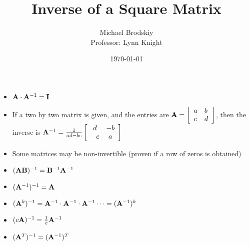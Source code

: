 \documentclass[12pt]{article}
\title{Inverse of a Square Matrix}
\date{\today}
\author{Michael Brodskiy\\ \small Professor: Lynn Knight}
\begin{document}
\maketitle

\begin{itemize}

  \item $\bold{A}\cdot\bold{A}^{-1}=\bold{I}$

  \item If a two by two matrix is given, and the entries are $\bold{A}=\left[ \begin{array}{l l} a & b\\ c & d\\ \end{array} \right]$, then the inverse is $\bold{A}^{-1}=\frac{1}{ad-bc}\left[ \begin{array}{c c} d & -b\\ -c & a\\ \end{array} \right]$

  \item Some matrices may be non-invertible (proven if a row of zeros is obtained)

  \item $(\bold{AB})^{-1}=\bold{B}^{-1}\bold{A}^{-1}$

  \item $(\bold{A}^{-1})^{-1}=\bold{A}$

  \item $(\bold{A}^{k})^{-1}=\bold{A}^{-1}\cdot\bold{A}^{-1}\cdot\bold{A}^{-1}\dots=(\bold{A}^{-1})^k$

  \item $(c\bold{A})^{-1}=\frac{1}{c}\bold{A}^{-1}$

  \item $(\bold{A}^T)^{-1}=(\bold{A}^{-1})^T$

\end{itemize}
\end{document}
